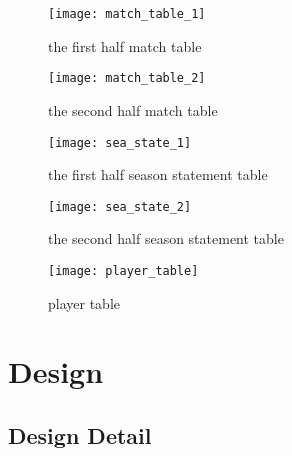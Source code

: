 \documentclass[conference,compsoc, twocolumn]{IEEEtran}
\begin{document}
\begin{figure}[htbp]
\centering\texttt{[image: match\_table\_1]}
\caption{the first half match table}
\end{figure}

\begin{figure}[htbp]
\centering\texttt{[image: match\_table\_2]}
\caption{the second half match table}
\end{figure}

\begin{figure}[htbp]
\centering\texttt{[image: sea\_state\_1]}
\caption{the first half season statement table}
\end{figure}

\begin{figure}[htbp]
\centering\texttt{[image: sea\_state\_2]}
\caption{the second half season statement table}
\end{figure}

\begin{figure}[htbp]
\centering\texttt{[image: player\_table]}
\caption{player table}
\end{figure}


\section{Design}

\subsection{Design Detail}
\end{document}
